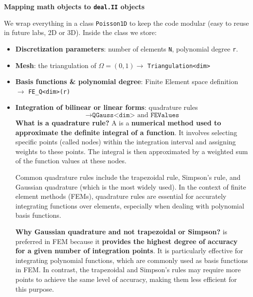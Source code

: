 \highspace
\begin{flushleft}
    \textcolor{Green3}{ \textbf{Mapping math objects to \texttt{deal.II} objects}}
\end{flushleft}
We wrap everything in a class \texttt{Poisson1D} to keep the code modular (easy to reuse in future labs, 2D or 3D). Inside the class we store:
\begin{itemize}
    \item \textbf{Discretization parameters}: number of elements \texttt{N}, polynomial degree \texttt{r}.
    \item \textbf{Mesh}: the triangulation of $\Omega=(0,1) \rightarrow$ \texttt{Triangulation<dim>}
    \item \textbf{Basis functions \& polynomial degree}: Finite Element space definition $\rightarrow$ \texttt{FE\_Q<dim>(r)}
    \item \textbf{Integration of bilinear or linear forms}: quadrature rules
    \begin{equation*}
        \rightarrow \texttt{QGauss<dim>} \text{ and } \texttt{FEValues}
    \end{equation*}
    \textcolor{Green3}{ \textbf{What is a quadrature rule?}} A  is a \textbf{numerical method used to approximate the definite integral of a function}. It involves selecting specific points (called nodes) within the integration interval and assigning weights to these points. The integral is then approximated by a weighted sum of the function values at these nodes.
    
    Common quadrature rules include the trapezoidal rule, Simpson's rule, and Gaussian quadrature (which is the most widely used). In the context of finite element methods (FEMs), quadrature rules are essential for accurately integrating functions over elements, especially when dealing with polynomial basis functions.

    \newpage

    \textcolor{Green3}{ \textbf{Why Gaussian quadrature and not trapezoidal or Simpson?}}  is preferred in FEM because it \textbf{provides the highest degree of accuracy for a given number of integration points}. It is particularly effective for integrating polynomial functions, which are commonly used as basis functions in FEM. In contrast, the trapezoidal and Simpson's rules may require more points to achieve the same level of accuracy, making them less efficient for this purpose.
    

\end{itemize}
